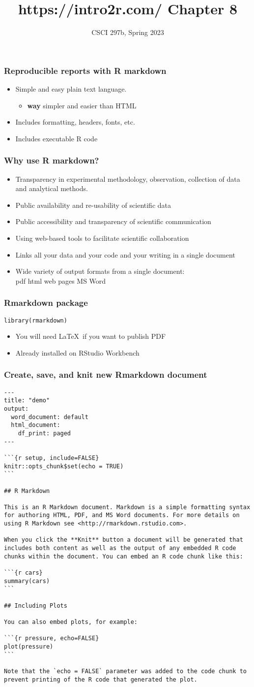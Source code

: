 \documentclass{beamer}
\title{{https://intro2r.com/} Chapter 8}
\author{CSCI 297b, Spring 2023}
\newcommand{\bi}{\begin{itemize}}
\newcommand{\li}{\item}
\newcommand{\ei}{\end{itemize}}
\newcommand{\bfr}[1]{\begin{frame}[fragile]\frametitle{{ #1 }}}
\begin{document}
\begin{frame}
\maketitle
\end{frame}

\bfr{Reproducible reports with R markdown}
\bi
\li Simple and easy plain text language.
\bi\li {\bf way} simpler and easier than HTML\ei
\li Includes formatting, headers, fonts, etc.
\li Includes executable R code
\ei
\end{frame}

\bfr{Why use R markdown?}
\bi
\li Transparency in experimental methodology, observation, collection of data and analytical methods.
\li Public availability and re-usability of scientific data
\li Public accessibility and transparency of scientific communication
\li Using web-based tools to facilitate scientific collaboration
\li Links all your data and your code and your writing in a single document
\li Wide variety of output formats from a single document:\\
{ pdf \hfill html \hfill web pages \hfill MS Word }
\ei
\end{frame}

\bfr{Rmarkdown package}
\begin{verbatim}
library(rmarkdown)
\end{verbatim}

\bi
\li You will need \LaTeX\ if you want to publish PDF
\li Already installed on RStudio Workbench
\ei
\end{frame}

\bfr{Create, save, and knit new Rmarkdown document}\tiny
\begin{verbatim}
---
title: "demo"
output:
  word_document: default
  html_document:
    df_print: paged
---

```{r setup, include=FALSE}
knitr::opts_chunk$set(echo = TRUE)
```

## R Markdown

This is an R Markdown document. Markdown is a simple formatting syntax for authoring HTML, PDF, and MS Word documents. For more details on using R Markdown see <http://rmarkdown.rstudio.com>.

When you click the **Knit** button a document will be generated that includes both content as well as the output of any embedded R code chunks within the document. You can embed an R code chunk like this:

```{r cars}
summary(cars)
```

## Including Plots

You can also embed plots, for example:

```{r pressure, echo=FALSE}
plot(pressure)
```

Note that the `echo = FALSE` parameter was added to the code chunk to prevent printing of the R code that generated the plot.
\end{verbatim}
\end{frame}
\end{document}
